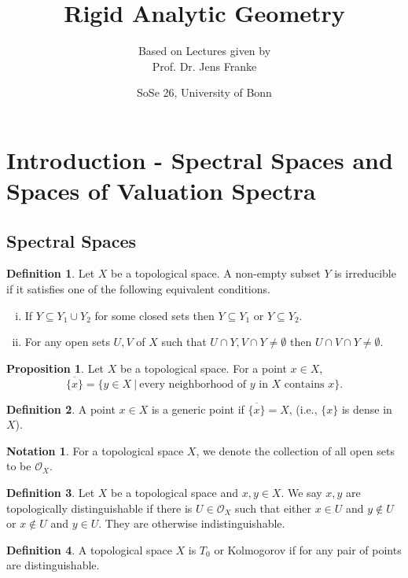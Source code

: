 \documentclass[10pt]{article}
\title{Rigid Analytic Geometry}
\author{Based on Lectures given by\\Prof. Dr. Jens Franke}
\date{SoSe 26, University of Bonn}
\numberwithin{equation}{section}
\theoremstyle{definition}
\newtheorem{proposition}{Proposition}[subsection]
\newtheorem{definition}{Definition}[subsection]
\newtheorem{notation}{Notation}[subsection]
\newcommand{\Ouv}{\mathscr{O}}
\newcommand{\sep}[0]{\:|\:}
\newcommand{\tor}[0]{\text{ or }}
\begin{document}
\maketitle

\section{Introduction - Spectral Spaces and Spaces of Valuation Spectra}

\subsection{Spectral Spaces}
\begin{definition}
    Let $X$ be a topological space. A non-empty subset $Y$ is irreducible if it satisfies one of the following equivalent conditions.
    \begin{enumerate}[i.]
        \item If $Y\subseteq Y_1\cup Y_2$ for some closed sets then $Y\subseteq Y_1 \tor Y\subseteq Y_2$.
        \item For any open sets $U,V$ of $X$ such that $U\cap Y,V\cap Y\not=\emptyset$ then $U\cap V\cap Y\not=\emptyset$.
    \end{enumerate}
\end{definition}
\begin{proposition}
    Let $X$ be a topological space. For a point $x\in X$,
    \begin{equation*}
        \overline{\{x\}} = \{ y \in X\sep \text{every neighborhood of $y$ in $X$ contains $x$}\}.
    \end{equation*}
\end{proposition}
\begin{definition}
    A point $x\in X$ is a generic point if $\overline{\{x\}} = X$, (i.e., $\{x\}$ is dense in $X$).
\end{definition}
\begin{notation}
    For a topological space $X$, we denote the collection of all open sets to be $\Ouv_X$.
\end{notation}
\begin{definition}
    \label{definition_1}
    Let $X$ be a topological space and $x,y\in X$. We say $x,y$ are topologically distinguishable if there is $U\in\Ouv_X$ such that either $x\in U$ and $y\not\in U$ or $x\not\in U$ and $y\in U$. They are otherwise indistinguishable.
\end{definition}
\begin{definition}
    A topological space $X$ is $T_0$ or Kolmogorov if for any pair of points are distinguishable.
\end{definition}
\end{document}
